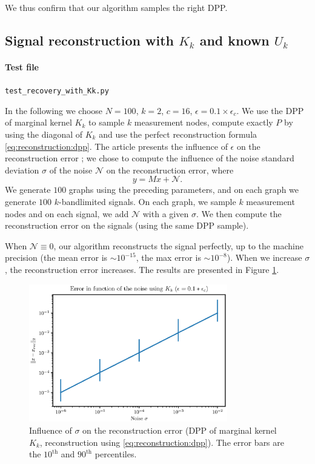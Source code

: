 \documentclass{article}
\begin{document}
We thus confirm that our algorithm samples the right DPP.

\subsection[Signal reconstruction with Kk qnd known Uk]{Signal reconstruction with $K_k$ and known $U_k$}


\paragraph{Test file} \verb#test_recovery_with_Kk.py#


In the following we choose $N=100$, $k=2$, $c=16$, $\epsilon = 0.1 \times \epsilon_c$. We use the DPP of marginal kernel $K_k$ to sample $k$ measurement nodes, compute exactly $P$ by using the diagonal of $K_k$ and use the perfect reconstruction formula \eqref{eq:reconstruction:dpp}. The article presents the influence of $\epsilon$ on the reconstruction error ; we chose to compute the influence of the noise standard deviation $\sigma$ of the noise $\mathcal{N}$ on the reconstruction error, where
\[ y = Mx + \mathcal{N}. \] 
We generate $100$ graphs using the preceding parameters, and on each graph we generate $100$ $k$-bandlimited signals. On each graph, we sample $k$ measurement nodes and on each signal, we add $\mathcal{N}$ with a given $\sigma$. We then compute the reconstruction error on the signals (using the same DPP sample).


When $\mathcal{N} \equiv 0$, our algorithm reconstructs the signal perfectly, up to the machine precision (the mean error is $\sim 10^{-15}$, the max error is $\sim 10^{-8}$). When we increase $\sigma$, the reconstruction error increases. The results are presented in Figure \ref{fig:Kk:recerror}.


\begin{figure}[ht]
\centering
\includegraphics[height=6cm]{error_function_noise_Kk.eps}
\caption{Influence of $\sigma$ on the reconstruction error (DPP of marginal kernel $K_k$, reconstruction using \eqref{eq:reconstruction:dpp}). The error bars are the $10^\text{th}$ and $90^\text{th}$ percentiles.} \label{fig:Kk:recerror}
\end{figure}
\end{document}
